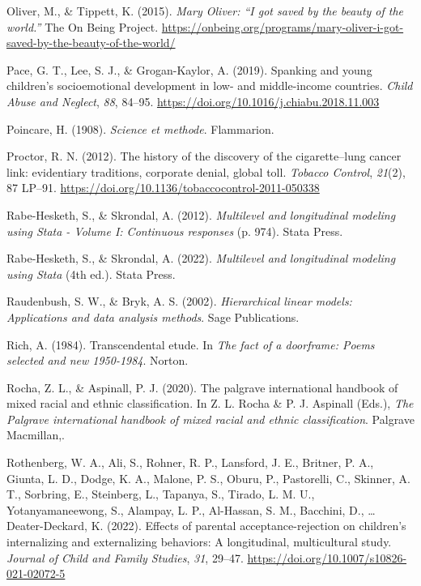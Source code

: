 \documentclass[
  letterpaper,
  DIV=11,
  numbers=noendperiod]{scrreprt}
\newlength{\cslhangindent}
\newenvironment{CSLReferences}[2] %
 {\begin{list}{}{%
  \setlength{\itemindent}{0pt}
  \setlength{\leftmargin}{0pt}
  \setlength{\parsep}{0pt}
  \ifodd #1
   \setlength{\leftmargin}{\cslhangindent}
   \setlength{\itemindent}{-1\cslhangindent}
  \fi
  \setlength{\itemsep}{#2\baselineskip}}}
 {\end{list}}
\begin{document}
\begin{CSLReferences}{1}{0}
Oliver, M., \& Tippett, K. (2015). \emph{{M}ary {O}liver: {``{I} got
saved by the beauty of the world.''}} The On Being Project.
\url{https://onbeing.org/programs/mary-oliver-i-got-saved-by-the-beauty-of-the-world/}

Pace, G. T., Lee, S. J., \& Grogan-Kaylor, A. (2019). {Spanking and
young children's socioemotional development in low- and middle-income
countries}. \emph{Child Abuse and Neglect}, \emph{88}, 84--95.
\url{https://doi.org/10.1016/j.chiabu.2018.11.003}

Poincare, H. (1908). \emph{Science et methode}. Flammarion.

Proctor, R. N. (2012). {The history of the discovery of the
cigarette--lung cancer link: evidentiary traditions, corporate denial,
global toll}. \emph{Tobacco Control}, \emph{21}(2), 87 LP--91.
\url{https://doi.org/10.1136/tobaccocontrol-2011-050338}

Rabe-Hesketh, S., \& Skrondal, A. (2012). \emph{Multilevel and
longitudinal modeling using {S}tata - {V}olume {I}: Continuous
responses} (p. 974). Stata Press.

Rabe-Hesketh, S., \& Skrondal, A. (2022). \emph{Multilevel and
longitudinal modeling using {S}tata} (4th ed.). Stata Press.

Raudenbush, S. W., \& Bryk, A. S. (2002). \emph{Hierarchical linear
models: Applications and data analysis methods}. Sage Publications.

Rich, A. (1984). Transcendental etude. In \emph{The fact of a doorframe:
Poems selected and new 1950-1984}. Norton.

Rocha, Z. L., \& Aspinall, P. J. (2020). The palgrave international
handbook of mixed racial and ethnic classification. In Z. L. Rocha \& P.
J. Aspinall (Eds.), \emph{The Palgrave international handbook of mixed
racial and ethnic classification}. Palgrave Macmillan,.

Rothenberg, W. A., Ali, S., Rohner, R. P., Lansford, J. E., Britner, P.
A., Giunta, L. D., Dodge, K. A., Malone, P. S., Oburu, P., Pastorelli,
C., Skinner, A. T., Sorbring, E., Steinberg, L., Tapanya, S., Tirado, L.
M. U., Yotanyamaneewong, S., Alampay, L. P., Al-Hassan, S. M., Bacchini,
D., \ldots{} Deater-Deckard, K. (2022). Effects of parental
acceptance-rejection on children's internalizing and externalizing
behaviors: A longitudinal, multicultural study. \emph{Journal of Child
and Family Studies}, \emph{31}, 29--47.
\url{https://doi.org/10.1007/s10826-021-02072-5}


\end{CSLReferences}
\end{document}
